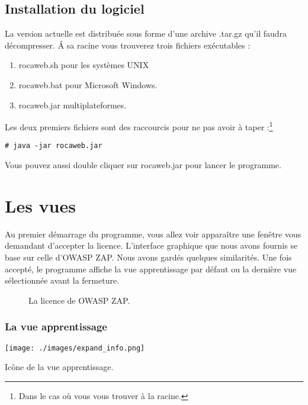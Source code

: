 \documentclass[a4paper,10pt,justified]{book}
\begin{document}

\section{Installation du logiciel}
La version actuelle est distribuée sous forme d'une archive .tar.gz  qu'il faudra décompresser. 
\'A sa racine vous trouverez  trois fichiers exécutables : 
\begin{enumerate}
 \item rocaweb.sh pour les systèmes UNIX
 \item rocaweb.bat  pour Microsoft Windows. 
 \item rocaweb.jar multiplateformes. 
\end{enumerate}
Les deux premiers fichiers sont des raccourcis pour ne pas avoir à taper :\footnote{Dans le cas où vous vous trouver à la racine.} 

\begin{lstlisting}[style=BashInputStyle]
# java -jar rocaweb.jar 
\end{lstlisting}

 



Vous pouvez aussi double cliquer sur rocaweb.jar pour lancer le programme. 

\chapter{Les vues}
Au premier démarrage du programme, vous allez voir apparaître une fenêtre vous demandant d'accepter la licence. 
L'interface graphique que nous avons fournis se base sur celle d'OWASP ZAP. Nous avons gardés quelques similarités. 
Une fois accepté, le programme affiche la vue apprentissage par défaut ou la dernière vue sélectionnée avant la fermeture. 


\begin{figure}
 \caption{La licence de OWASP ZAP.}
\end{figure}

 


\subsection{La vue apprentissage}
\begin{marginfigure}
 \texttt{[image: ./images/expand\_info.png]}
 \label{iconevueapprentissage}
\caption{Icône de la vue apprentissage.}
 \end{marginfigure}
\end{document}
